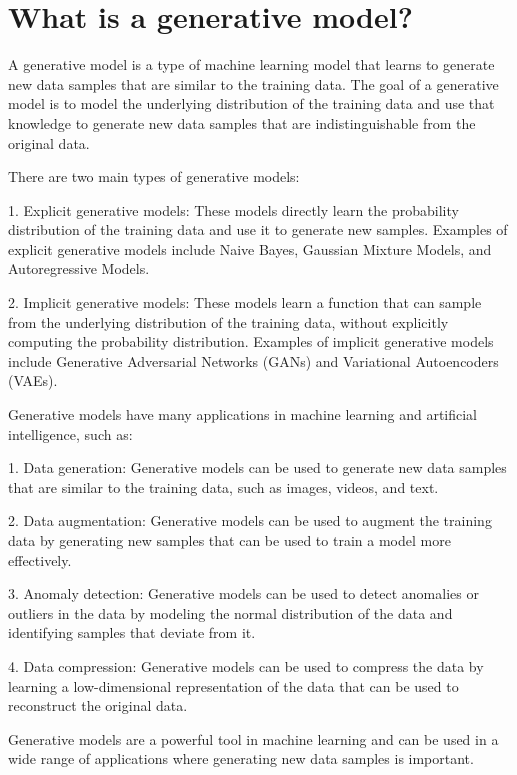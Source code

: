 \section{What is a generative model?}
A generative model is a type of machine learning model that learns to generate new data samples that are similar to the training data. The goal of a generative model is to model the underlying distribution of the training data and use that knowledge to generate new data samples that are indistinguishable from the original data.

There are two main types of generative models:

1. Explicit generative models: These models directly learn the probability distribution of the training data and use it to generate new samples. Examples of explicit generative models include Naive Bayes, Gaussian Mixture Models, and Autoregressive Models.

2. Implicit generative models: These models learn a function that can sample from the underlying distribution of the training data, without explicitly computing the probability distribution. Examples of implicit generative models include Generative Adversarial Networks (GANs) and Variational Autoencoders (VAEs).

Generative models have many applications in machine learning and artificial intelligence, such as:

1. Data generation: Generative models can be used to generate new data samples that are similar to the training data, such as images, videos, and text.

2. Data augmentation: Generative models can be used to augment the training data by generating new samples that can be used to train a model more effectively.

3. Anomaly detection: Generative models can be used to detect anomalies or outliers in the data by modeling the normal distribution of the data and identifying samples that deviate from it.

4. Data compression: Generative models can be used to compress the data by learning a low-dimensional representation of the data that can be used to reconstruct the original data.

Generative models are a powerful tool in machine learning and can be used in a wide range of applications where generating new data samples is important.

